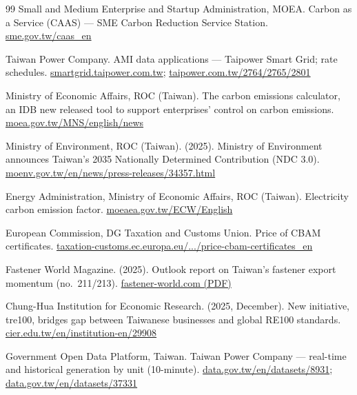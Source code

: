\begin{thebibliography}{99}
 Small and Medium Enterprise and Startup Administration, MOEA.
Carbon as a Service (CAAS) --- SME Carbon Reduction Service Station.
\href{https://www.sme.gov.tw/caas_en/masterpage-caas_en}{sme.gov.tw/caas\_en}

 Taiwan Power Company. AMI data applications --- Taipower
Smart Grid; rate schedules.
\href{https://smartgrid.taipower.com.tw/en/Data_Analytics/AMI_Data_Applications}{smartgrid.taipower.com.tw};
\href{https://www.taipower.com.tw/2764/2765/2801/}{taipower.com.tw/2764/2765/2801}

 Ministry of Economic Affairs, ROC (Taiwan). The carbon emissions
calculator, an IDB new released tool to support enterprises' control on carbon
emissions.
\href{https://www.moea.gov.tw/MNS/english/news/News.aspx?kind=6&menu_id=176&news_id=102426}{moea.gov.tw/MNS/english/news}

 Ministry of Environment, ROC (Taiwan). (2025). Ministry of
Environment announces Taiwan's 2035 Nationally Determined Contribution
(NDC 3.0).
\href{https://www.moenv.gov.tw/en/news/press-releases/34357.html}{moenv.gov.tw/en/news/press-releases/34357.html}

 Energy Administration, Ministry of Economic Affairs, ROC
(Taiwan). Electricity carbon emission factor.
\href{https://www.moeaea.gov.tw/ECW/English/content/Content.aspx?menu_id=24200}{moeaea.gov.tw/ECW/English}

 European Commission, DG Taxation and Customs Union. Price of
CBAM certificates.
\href{https://taxation-customs.ec.europa.eu/carbon-border-adjustment-mechanism/price-cbam-certificates_en}{taxation-customs.ec.europa.eu/.../price-cbam-certificates\_en}

 Fastener World Magazine. (2025). Outlook report on Taiwan's
fastener export momentum (no.~211/213).
\href{https://www.fastener-world.com/data/pdf_download/FW_211_E_251.pdf}{fastener-world.com (PDF)}

 Chung-Hua Institution for Economic Research. (2025, December).
New initiative, tre100, bridges gap between Taiwanese businesses and global
RE100 standards.
\href{https://www.cier.edu.tw/en/institution-en/29908/}{cier.edu.tw/en/institution-en/29908}

 Government Open Data Platform, Taiwan. Taiwan Power
Company --- real-time and historical generation by unit (10-minute).
\href{https://data.gov.tw/en/datasets/8931}{data.gov.tw/en/datasets/8931};
\href{https://data.gov.tw/en/datasets/37331}{data.gov.tw/en/datasets/37331}


\end{thebibliography}
